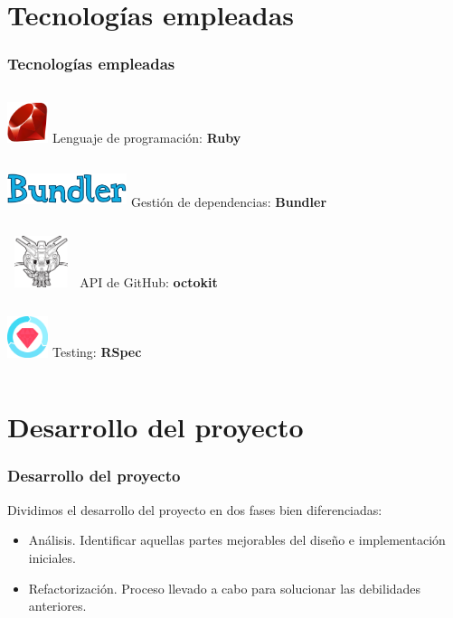 \documentclass{beamer}
\begin{document}
\section{Tecnologías empleadas}
\begin{frame}[fragile]
  \frametitle{Tecnologías empleadas}
  \begin{columns}
       \centering
       \includegraphics[height=1.2cm, width=1.2cm]{img/ruby-logo.png}
        Lenguaje de programación: \textbf{Ruby}
  \end{columns}
  \bigskip

  \begin{columns}
       \centering
       \includegraphics[height=1cm, width=3.5cm]{img/bundler-logo.png}
        Gestión de dependencias: \textbf{Bundler}
  \end{columns}
  \bigskip

  \begin{columns}
       \centering
       \includegraphics[height=1.5cm, width=2cm]{img/octokit-logo.png}
        API de GitHub: \textbf{octokit}
  \end{columns}
  \bigskip

  \begin{columns}
       \centering
       \includegraphics[height=1.2cm, width=1.2cm]{img/rspec-logo.png}
        Testing: \textbf{RSpec}
  \end{columns}
\end{frame}

\section{Desarrollo del proyecto}
\begin{frame}
\frametitle{Desarrollo del proyecto}
  Dividimos el desarrollo del proyecto en dos fases bien diferenciadas:
  \begin{itemize}
    \item Análisis. Identificar aquellas partes mejorables del diseño e implementación iniciales.
    \item Refactorización. Proceso llevado a cabo para solucionar las debilidades anteriores.
  \end{itemize}
\end{frame}
\end{document}

